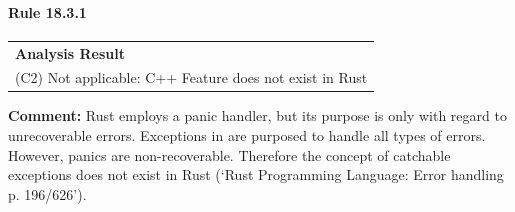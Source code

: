 \paragraph{Rule 18.3.1}
\begin{longtable}{p{13cm}}
\textbf{Analysis Result} \\
(C2) Not applicable: C++ Feature does not exist in Rust \\
\end{longtable}
\textbf{Comment:} Rust employs a panic handler, but its purpose is only with regard to unrecoverable errors. Exceptions in \Cpp are purposed to handle all types of errors. However, panics are non-recoverable. Therefore the concept of catchable exceptions does not exist in Rust (`Rust Programming Language: Error handling p. 196/626'). \\
